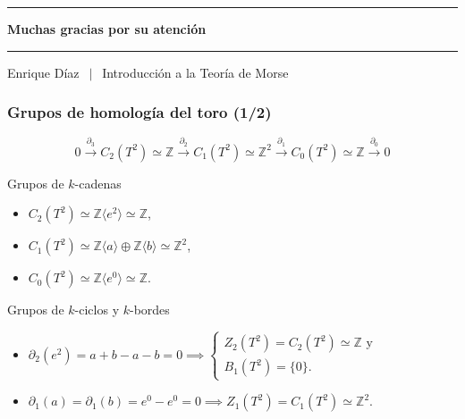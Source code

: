 \documentclass[11pt]{beamer}
\begin{document}
\begin{frame}[plain]
\centering
\vfill

\rule{0.9\textwidth}{1pt}

\vspace{1.5em}

{\Huge \bfseries Muchas gracias por su atención}

\vspace{1.5em}

\color{structure}
\rule{0.5\textwidth}{1pt}

\vfill

{\footnotesize Enrique Díaz $~~|~~$ Introducción a la Teoría de Morse}

\end{frame}



\begin{frame}
\frametitle{Grupos de homología del toro (1/2)}
	\vspace{-0.5em}
	\[
	\boxed{0\overset{\partial_3}{\longrightarrow} C_2(T^2)\simeq \mathbb{Z} \overset{\partial_2}{\longrightarrow} C_1(T^2)\simeq \mathbb{Z}^2 \overset{\partial_1}{\longrightarrow} C_0(T^2)\simeq \mathbb{Z}\overset{\partial_0}{\longrightarrow} 0}
	\]

	\begin{block}{Grupos de $k$-cadenas}
		\begin{itemize}[itemsep=8pt]
			\item $C_2(T^2)\simeq \mathbb{Z}\langle e^2 \rangle \simeq \mathbb{Z}$,
			\item $C_1(T^2)\simeq \mathbb{Z}\langle a \rangle \oplus \mathbb{Z}\langle b \rangle \simeq \mathbb{Z}^2$,
			\item $C_0(T^2)\simeq \mathbb{Z}\langle e^0 \rangle\simeq \mathbb{Z}$.
		\end{itemize}
	\end{block}

	\begin{block}{Grupos de $k$-ciclos y $k$-bordes}
		\begin{itemize}[itemsep=10pt]
			\item $\partial_2(e^2) = a + b - a - b = 0 \implies
			\begin{cases}
				 Z_2(T^2)=C_2(T^2)\simeq \mathbb{Z} \text{ y } \\
				 B_1(T^2)=\{0\}.
			\end{cases}$
			\item $\partial_1(a) = \partial_1(b) = e^0 - e^0 = 0 \implies Z_1(T^2)=C_1(T^2)\simeq \mathbb{Z}^2$.
		\end{itemize}
	\end{block}

\end{frame}
\end{document}
